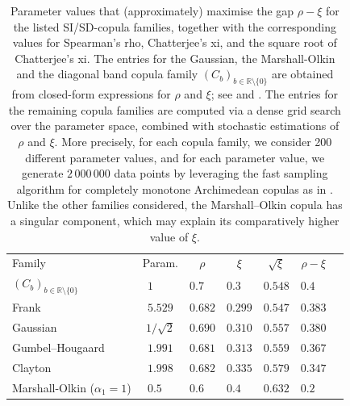 \documentclass{article}
\theoremstyle{plain}
\theoremstyle{definition}
\begin{document}
\begin{table}[tb]
  \caption{
  Parameter values that (approximately) maximise the gap $\rho-\xi$ for the listed SI/SD-copula families, together with the corresponding values for Spearman's rho, Chatterjee's xi, and the square root of Chatterjee's xi.
  The entries for the Gaussian, the Marshall-Olkin and the diagonal band copula family $(C_b)_{b\in{\mathbb{R}}\setminus\{0\}}$ are obtained from closed-form expressions for \(\rho\) and \(\xi\); see \cite{fuchs2021quantifying} and \cite[Table 6]{Ansari-Rockel-2023}. The entries for the remaining copula families are computed via a dense grid search over the parameter space, combined with stochastic estimations of $\rho$ and $\xi$. More precisely, for each copula family, we consider 200 different parameter values, and for each parameter value, we generate $2\,000\,000$ data points by leveraging the fast sampling algorithm for completely monotone Archimedean copulas as in \cite[Alg.~7.53]{Embrechts-2015}.
  Unlike the other families considered, the Marshall–Olkin copula has a singular component, which may explain its comparatively higher value of \(\xi\).
  }
  \centering
\begin{tabular*}{\textwidth}{@{\extracolsep{\fill}} lcccccc @{}}
  \toprule
  Family & Param. & $\rho$ & $\xi$ & $\sqrt{\xi}$ & $\rho-\xi$ %
  \\
  $(C_b)_{b\in\mathbb{R}\setminus\{0\}}$
    & \(1\phantom{.000}\)
    & \(0.7\phantom{00}\)
    & \(0.3\phantom{00}\)
    & \(0.548\)
    & \(0.4\phantom{00}\) 
    \\
  Frank
    & \(5.529\)
    & \(0.682\)
    & \(0.299\)
    & \(0.547\)
    & \(0.383\) 
    \\
  Gaussian
    & \(1/\sqrt{2}\)
    & \(0.690\)
    & \(0.310\)
    & \(0.557\)
    & \(0.380\) 
    \\
  Gumbel--Hougaard
    & \(1.991\)
    & \(0.681\)
    & \(0.313\)
    & \(0.559\)
    & \(0.367\) 
    \\
  Clayton
    & \(1.998\)
    & \(0.682\)
    & \(0.335\)
    & \(0.579\)
    & \(0.347\) 
    \\
  Marshall-Olkin (\(\alpha_1=1\))
    & \(0.5\phantom{00}\)
    & \(0.6\phantom{00}\)
    & \(0.4\phantom{00}\)
    & \(0.632\)
    & \(0.2\phantom{00}\) 
    \\
  \bottomrule
\end{tabular*}
  \label{tab:rho_minus_xi_max}
\end{table}
\end{document}
